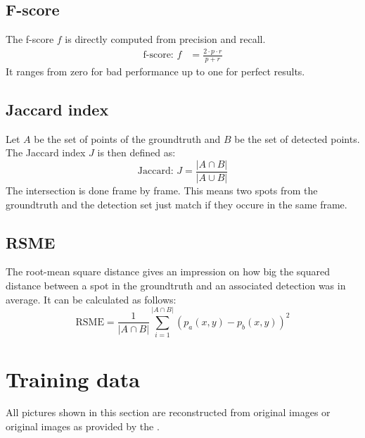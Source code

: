 \subsection*{F-score}
The f-score $f$ is directly computed from precision and recall.
\begin{eqnarray}
	\text{f-score: }f &=\frac{2\cdot p \cdot r}{p+r} 
\end{eqnarray}
It ranges from zero for bad performance up to one for perfect results.
\subsection*{Jaccard index}
Let $A$ be the set of points of the groundtruth and $B$ be the set of detected points. The Jaccard index $J$ is then defined as:
\begin{equation}
\text{Jaccard: }J = \frac{\left|A\cap B\right|}{\left|A\cup B\right|}
\end{equation}
The intersection is done frame by frame. This means two spots from the groundtruth and the detection set just match if they occure in the same frame. 
\subsection*{RSME}
The root-mean square distance gives an impression on how big the squared distance between a spot in the groundtruth and an associated detection was in average. It can be calculated as follows:
\begin{equation}
\text{RSME} = \frac{1}{\left|A\cap B\right|}\sum\limits_{i=1}^{\left|A\cap B\right|} \left(p_a(x,y)-p_b(x,y)\right)^2
\end{equation}
\section{Training data}
All pictures shown in this section are reconstructed from original images or original images as provided by the \cite{challenge}.
